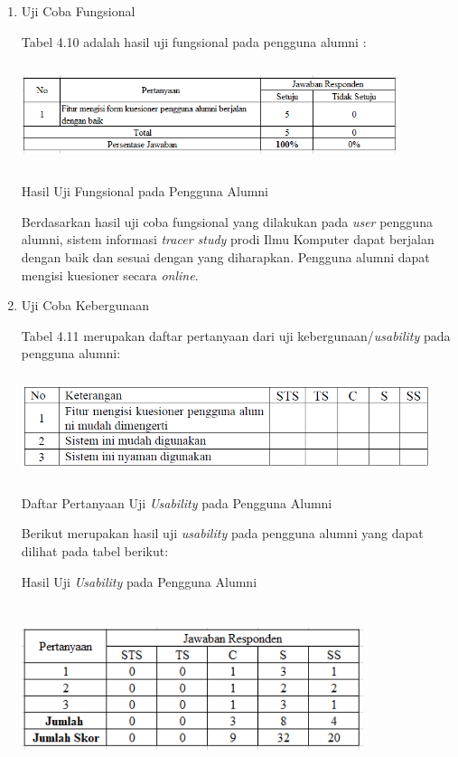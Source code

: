 \begin{enumerate}
	\item Uji Coba Fungsional
	
	Tabel 4.10 adalah hasil uji fungsional pada pengguna alumni :
	
	\begin{table}[H]
		\centering
		\includegraphics[width=11cm,height=3cm]{gambar/UAT/f_pengguna}
		\caption{Hasil Uji Fungsional pada Pengguna Alumni}
		\label{f_pengguna}
	\end{table}
	
	Berdasarkan hasil uji coba fungsional yang dilakukan pada \textit{user} pengguna alumni, sistem informasi
	\textit{tracer study} prodi Ilmu Komputer dapat berjalan dengan baik dan sesuai dengan yang diharapkan. Pengguna alumni dapat mengisi kuesioner secara \textit{online}.
	
	\item Uji Coba Kebergunaan
	
	Tabel 4.11 merupakan daftar pertanyaan dari uji kebergunaan/\textit{usability} pada pengguna alumni:
	
	\begin{table}[H]
		\centering
		\includegraphics[width=12cm,height=3cm]{gambar/UAT/u_pengguna}
		\caption{Daftar Pertanyaan Uji \textit{Usability} pada Pengguna Alumni}
		\label{u_pengguna}
	\end{table}
	
	Berikut merupakan hasil uji \textit{usability} pada pengguna alumni yang dapat dilihat pada tabel berikut:
	
	\begin{table}[H]
		\centering
		\caption{Hasil Uji \textit{Usability} pada Pengguna Alumni}
		\includegraphics[width=10cm,height=5cm]{gambar/UAT/hasil_u_pengguna}
		\label{h_u_pengguna}
	\end{table}
	

\end{enumerate}
